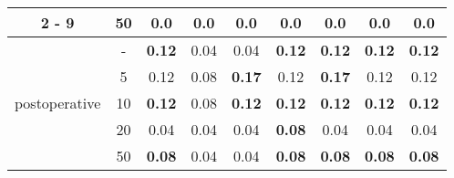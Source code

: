 \documentclass{article}%
\begin{document}
\begin{tabular}{c|c|ccccccc}
\cline{2%
-%
9}%
&50&0.0&0.0&0.0&0.0&0.0&0.0&0.0\\%
\hline%
\multirow{5}{*}{postoperative}&{-}&\textbf{0.12}&0.04&0.04&\textbf{0.12}&\textbf{0.12}&\textbf{0.12}&\textbf{0.12}\\%
\cline{2%
-%
9}%
&5&0.12&0.08&\textbf{0.17}&0.12&\textbf{0.17}&0.12&0.12\\%
\cline{2%
-%
9}%
&10&\textbf{0.12}&0.08&\textbf{0.12}&\textbf{0.12}&\textbf{0.12}&\textbf{0.12}&\textbf{0.12}\\%
\cline{2%
-%
9}%
&20&0.04&0.04&0.04&\textbf{0.08}&0.04&0.04&0.04\\%
\cline{2%
-%
9}%
&50&\textbf{0.08}&0.04&0.04&\textbf{0.08}&\textbf{0.08}&\textbf{0.08}&\textbf{0.08}\\%
\hline%
\end{tabular}

%
\end{document}
